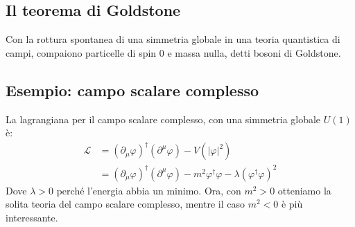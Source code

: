 \documentclass[italian,a4paper]{article}
\theoremstyle{definition}
\newcommand{\lagr}{\ensuremath{\mathscr{L}}}
\begin{document}
\subsection{Il teorema di Goldstone}\label{goldstone}
Con la rottura spontanea di una simmetria globale in una teoria quantistica
di campi, compaiono particelle di spin $0$ e massa nulla, detti bosoni di
Goldstone.
\subsection*{Esempio: campo scalare complesso}
La lagrangiana per il campo scalare complesso, con una simmetria globale
$U(1)$ \`e:
\begin{align*}
    \lagr &= (\partial_\mu \varphi)^\dagger (\partial^\mu \varphi) -
    V(|\varphi|^2)\\
    &= (\partial_\mu \varphi)^\dagger (\partial^\mu \varphi) -
    m^2\varphi^\dagger\varphi - \lambda (\varphi^\dagger \varphi)^2
\end{align*}
Dove $\lambda > 0$ perch\'e l'energia abbia un minimo. Ora, con $m^2 > 0$
otteniamo la solita teoria del campo scalare complesso, mentre il caso
$m^2 < 0$ \`e pi\`u interessante.
\end{document}
